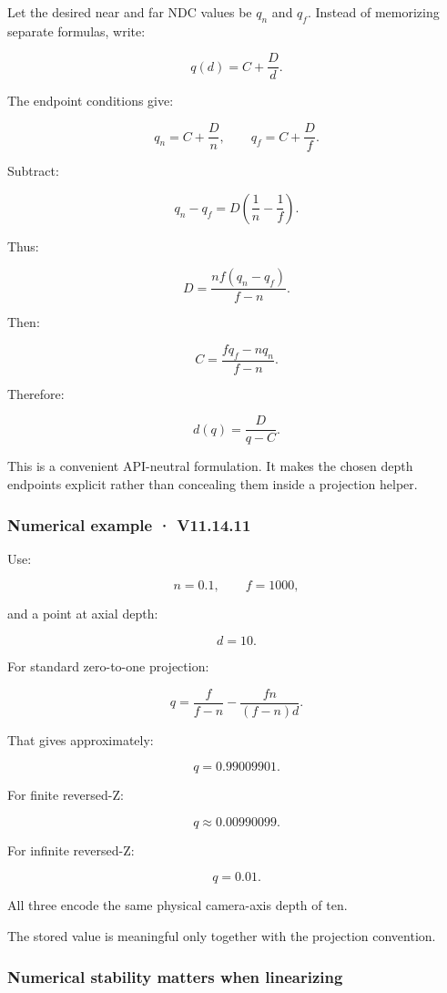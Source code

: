Let the desired near and far NDC values be \(q_n\) and \(q_f\). Instead of memorizing separate formulas, write:

\[ q(d)=C+\frac Dd. \]

The endpoint conditions give:

\[ q_n=C+\frac Dn, \qquad q_f=C+\frac Df. \]

Subtract:

\[ q_n-q_f=D\left(\frac1n-\frac1f\right). \]

Thus:

\[ \boxed{ D=\frac{nf(q_n-q_f)}{f-n}. } \]

Then:

\[ \boxed{ C=\frac{fq_f-nq_n}{f-n}. } \]

Therefore:

\[ \boxed{ d(q)=\frac D{q-C}. } \]

This is a convenient API-neutral formulation. It makes the chosen depth endpoints explicit rather than concealing them inside a projection helper.

\subsubsection{Numerical example · V11.14.11}\label{numerical-example-v11.14.11}

Use:

\[ n=0.1,\qquad f=1000, \]

and a point at axial depth:

\[ d=10. \]

For standard zero-to-one projection:

\[ q=\frac f{f-n}-\frac{fn}{(f-n)d}. \]

That gives approximately:

\[ \boxed{q=0.99009901}. \]

For finite reversed-Z:

\[ \boxed{q\approx0.00990099}. \]

For infinite reversed-Z:

\[ \boxed{q=0.01}. \]

All three encode the same physical camera-axis depth of ten.

The stored value is meaningful only together with the projection convention.

\subsubsection{Numerical stability matters when linearizing}\label{numerical-stability-matters-when-linearizing}

